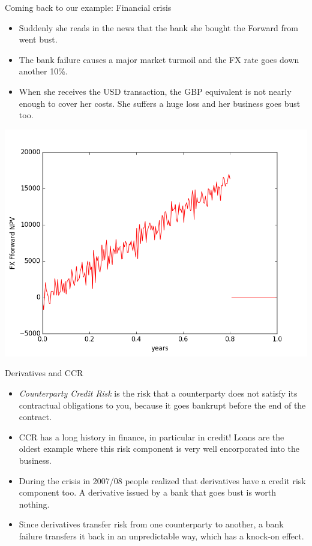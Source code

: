 \documentclass[t]{beamer}
\begin{document}
\begin{frame}{Coming back to our example: Financial crisis}
	\begin{itemize}
		\item
			Suddenly she reads in the news that the bank she bought the Forward from went bust.
		\item
			The bank failure causes a major market turmoil and the FX rate goes down another 10\%.
		\item
			When she receives the USD transaction, the GBP equivalent is not nearly enough to cover her costs. She suffers a huge loss and her business goes bust too.
	\end{itemize}
	\vspace{-2em}
	\begin{center}
		\includegraphics[scale=0.25]{pics/fx_default.png}
	\end{center}		
\end{frame}


\begin{frame}{Derivatives and CCR}
	\begin{itemize}
		\item
			\emph{Counterparty Credit Risk} is the risk that a counterparty does not satisfy its contractual obligations to you, because it goes bankrupt before the end of the contract.
	\item
		CCR has a long history in finance, in particular in credit! Loans are the oldest example where this risk component is very well encorporated into the business.
	\item
		During the crisis in 2007/08 people realized that derivatives have a credit risk component too. A derivative issued by a bank that goes bust is worth nothing.
	\item
		Since derivatives transfer risk from one counterparty to another, a bank failure transfers it back in an unpredictable way, which has a knock-on effect.
	\end{itemize}
\end{frame}
\end{document}
